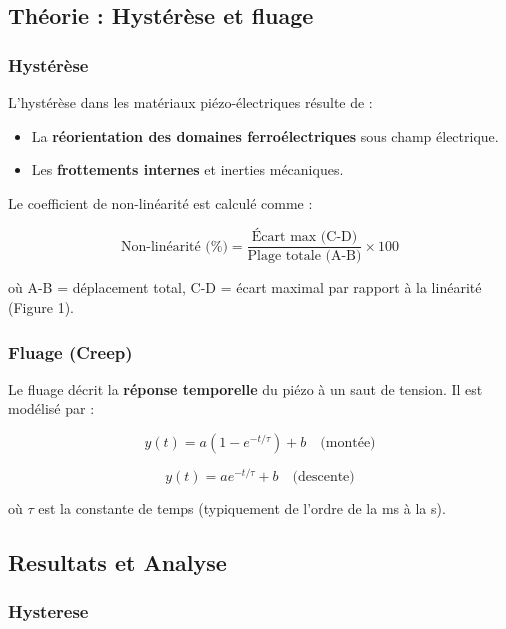 \subsection{Théorie : Hystérèse et fluage}
\subsubsection{Hystérèse}
L'hystérèse dans les matériaux piézo-électriques résulte de :

\begin{itemize}
    \item La \textbf{réorientation des domaines ferroélectriques} sous champ électrique.
    \item Les \textbf{frottements internes} et inerties mécaniques.
\end{itemize}
Le coefficient de non-linéarité est calculé comme :

\begin{equation}
    \text{Non-linéarité (\%)} = \frac{\text{Écart max (C-D)}}{\text{Plage totale (A-B)}} \times 100
    \label{eq:eq_lin}
\end{equation}

où A-B = déplacement total, C-D = écart maximal par rapport à la linéarité (Figure 1).

\subsubsection{Fluage (Creep)}
Le fluage décrit la \textbf{réponse temporelle} du piézo à un saut de tension. Il est modélisé par :

\begin{equation}
    y(t) = a \left(1 - e^{-t/\tau}\right) + b \quad \text{(montée)}
    \label{eq:t_m}
\end{equation}

\begin{equation}
    y(t) = a e^{-t/\tau} + b \quad \text{(descente)}
    \label{eq:t_d}
\end{equation}

où $\tau$ est la constante de temps (typiquement de l'ordre de la ms à la s).

\subsection{Resultats et Analyse}

\subsubsection{Hysterese}

